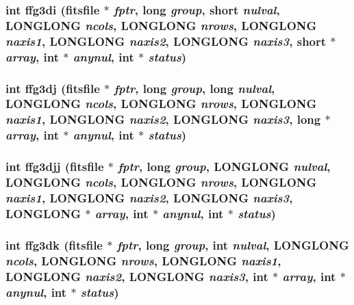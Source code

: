 \subsubsection{\setlength{\rightskip}{0pt plus 5cm}int ffg3di (\bf{fitsfile} $\ast$ {\em fptr}, long {\em group}, short {\em nulval}, \bf{LONGLONG} {\em ncols}, \bf{LONGLONG} {\em nrows}, \bf{LONGLONG} {\em naxis1}, \bf{LONGLONG} {\em naxis2}, \bf{LONGLONG} {\em naxis3}, short $\ast$ {\em array}, int $\ast$ {\em anynul}, int $\ast$ {\em status})}\label{fitsio_8h_949ee59c2b5d120e7357d60a4ce6f9e8}


\subsubsection{\setlength{\rightskip}{0pt plus 5cm}int ffg3dj (\bf{fitsfile} $\ast$ {\em fptr}, long {\em group}, long {\em nulval}, \bf{LONGLONG} {\em ncols}, \bf{LONGLONG} {\em nrows}, \bf{LONGLONG} {\em naxis1}, \bf{LONGLONG} {\em naxis2}, \bf{LONGLONG} {\em naxis3}, long $\ast$ {\em array}, int $\ast$ {\em anynul}, int $\ast$ {\em status})}\label{fitsio_8h_5677946e8378660c33bf9fcec0750f6f}


\subsubsection{\setlength{\rightskip}{0pt plus 5cm}int ffg3djj (\bf{fitsfile} $\ast$ {\em fptr}, long {\em group}, \bf{LONGLONG} {\em nulval}, \bf{LONGLONG} {\em ncols}, \bf{LONGLONG} {\em nrows}, \bf{LONGLONG} {\em naxis1}, \bf{LONGLONG} {\em naxis2}, \bf{LONGLONG} {\em naxis3}, \bf{LONGLONG} $\ast$ {\em array}, int $\ast$ {\em anynul}, int $\ast$ {\em status})}\label{fitsio_8h_c2e9349d1c1fc906b74067636dd67391}


\subsubsection{\setlength{\rightskip}{0pt plus 5cm}int ffg3dk (\bf{fitsfile} $\ast$ {\em fptr}, long {\em group}, int {\em nulval}, \bf{LONGLONG} {\em ncols}, \bf{LONGLONG} {\em nrows}, \bf{LONGLONG} {\em naxis1}, \bf{LONGLONG} {\em naxis2}, \bf{LONGLONG} {\em naxis3}, int $\ast$ {\em array}, int $\ast$ {\em anynul}, int $\ast$ {\em status})}\label{fitsio_8h_0cff4d8eb0cb5aca051a619964159b33}


